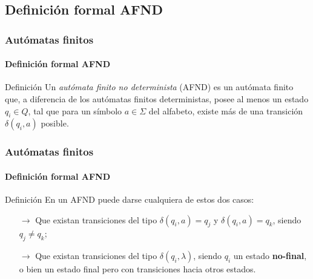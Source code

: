 \documentclass{beamer}
\begin{document}
        \subsection{Definici\'on formal AFND}

        \begin{frame}
			\frametitle{Aut\'omatas finitos}
			\framesubtitle{Definici\'on formal AFND}

            \begin{block}{Definici\'on}
                Un \emph{aut\'omata finito no determinista} (AFND) es un aut\'omata finito que, a diferencia de los aut\'omatas finitos deterministas, posee al menos un estado $q_{i} \in Q$, tal que para un s\'imbolo $a \in \Sigma$ del alfabeto, existe m\'as de una transici\'on $\delta(q_{i},a)$ posible.
            \end{block}
		\end{frame}

        \begin{frame}
			\frametitle{Aut\'omatas finitos}
			\framesubtitle{Definici\'on formal AFND}

            \begin{block}{Definici\'on}
                En un AFND puede darse cualquiera de estos dos casos:
                \begin{itemize}
                    \item[$\rightarrow$] Que existan transiciones del tipo $\delta(q_{i},a)=q_{j}$ y $\delta(q_{i},a)=q_{k}$, siendo $q_{j} \neq q_{k}$;
                    \item[$\rightarrow$] Que existan transiciones del tipo $\delta(q_{i},\lambda)$, siendo $q_{i}$ un estado \textbf{no-final}, o bien un estado final pero con transiciones hacia otros estados.
                \end{itemize}
            \end{block}
		\end{frame}
\end{document}
